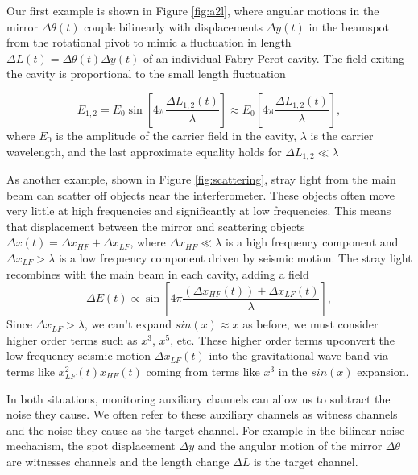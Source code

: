 \begin{refsection}
Our first example is shown in Figure 
\ref{fig:a2l}, where
angular motions in the mirror $\Delta \theta (t)$ couple bilinearly with displacements $\Delta y (t)$ in the beamspot from the rotational pivot to mimic a fluctuation in length $\Delta L (t)=\Delta\theta(t) \Delta y(t)$ of an individual Fabry Perot cavity. The field exiting the cavity is proportional to the small length fluctuation

\begin{equation}
E_{1,2}=E_0\sin \left[4\pi \frac{\Delta L_{1,2}(t)}{\lambda} \right]\approx E_0 \left[4\pi \frac{\Delta L_{1,2}(t)}{\lambda} \right],
\end{equation}
where $E_0$ is the amplitude of the carrier field in the cavity, $\lambda $ is the carrier wavelength, and the last approximate equality holds for $\Delta L_{1,2} \ll \lambda$

 As another example, shown in 
Figure \ref{fig:scattering}, 
stray light from the main beam can scatter off objects near the interferometer. These objects often move very little at high frequencies and significantly at low frequencies. This means that displacement between the mirror and scattering objects $\Delta x(t) =\Delta x_{HF}+\Delta x_{LF}$, where  $\Delta x_{HF}\ll \lambda$ is a high frequency component and  $\Delta x_{LF} > \lambda$ is a low frequency component driven by seismic motion. The stray light recombines with the main beam in each cavity, adding a field 
\begin{equation}
\Delta E(t) \propto \sin \left[4\pi \frac{(\Delta x_{HF}(t))+\Delta x_{LF}(t)}{\lambda} \right],
\end{equation}
Since $\Delta x_{LF} > \lambda$, we can't expand $sin(x) \approx x $ as before, we must consider higher order terms such as $x^3$, $x^5$, etc. These higher order terms upconvert the low frequency seismic motion $\Delta x_{LF}(t)$ into the gravitational wave band via terms like $x_{LF}^2(t)x_{HF}(t)$ coming from terms like $x^3$ in the $sin(x)$ expansion.

In both situations, monitoring auxiliary channels can allow us to subtract the noise they cause.  We often refer to these auxiliary channels as witness channels and the noise they cause as the target channel. For example in the bilinear noise mechanism, the spot displacement $\Delta y$ and the angular motion of the mirror $\Delta \theta$ are witnesses channels and the length change $\Delta L$ is the target channel. 


\end{refsection}
